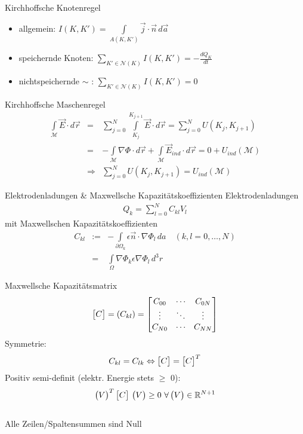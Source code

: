 \documentclass[a6paper]{kartei}
\begin{document}
\begin{karte}{Kirchhoffsche Knotenregel}
\begin{itemize}
\item allgemein: $I(K,K') = \int \limits_{A(K,K')} \vec{j} \cdot \vec{n} \, d\vec{a} $
\item speichernde Knoten: $\sum \limits_{K' \in \mathcal{N}(K)} I(K,K') = - \frac{dQ_{K}}{dt}$
\item nichtspeichernde $\sim$ : $\sum \limits_{K' \in \mathcal{N}(K)} I(K,K') = 0$
\end{itemize}
\end{karte}

\begin{karte}{Kirchhoffsche Maschenregel}
\begin{eqnarray*}
\int \limits_{\mathcal{M}} \vec{E} \cdot d\vec{r} & = &  \sum \limits_{j=0}^{N} \int \limits_{K_{j}}^{K_{j+1}} \vec{E} \cdot d\vec{r} = \sum \limits_{j=0}^{N} U(K_{j},K_{j+1}) \nonumber \\
& = & - \int \limits_{\mathcal{M}} \nabla \Phi \cdot d\vec{r} + \int \limits_{\mathcal{M}} \vec{E}_{ind} \cdot d\vec{r} = 0 + U_{ind}(\mathcal{M}) \nonumber \\
& \Rightarrow & \sum \limits_{j=0}^{N} U(K_{j},K_{j+1})  =  U_{ind}(\mathcal{M})
\end{eqnarray*}
\end{karte}

\begin{karte}{Elektrodenladungen \& Maxwellsche Kapazitätskoeffizienten}
Elektrodenladungen
 \begin{eqnarray*}
Q_{k} = \sum \limits_{l=0}^{N} C_{kl} V_{l}
\end{eqnarray*}
mit Maxwellschen Kapazitätskoeffizienten 
\begin{eqnarray*}
C_{kl} & :=  & - \int \limits_{\partial \Omega_{k}} \epsilon \vec{n} \cdot \nabla \Phi_{l} \, da \quad (k,l = 0, \dots, N) \\
& = & \int \limits_{\Omega} \nabla \Phi_{k} \epsilon \nabla \Phi_{l} \, d^3r
\end{eqnarray*}
\end{karte}

\begin{karte}{Maxwellsche Kapazitätsmatrix}
\begin{eqnarray*}
\begin{bmatrix} C \end{bmatrix} = (C_{kl}) = \begin{bmatrix} C_{00} & \cdots & C_{0N} \\ \vdots & \ddots & \vdots \\ C_{N0} & \cdots & C_{NN} \end{bmatrix}
\end{eqnarray*}
Symmetrie: 
\begin{eqnarray*}
C_{kl} = C_{lk} \Leftrightarrow \begin{bmatrix} C \end{bmatrix} = \begin{bmatrix} C \end{bmatrix}^{T}
\end{eqnarray*}
Positiv semi-definit (elektr. Energie stets $\geq$ 0): 
\begin{eqnarray*}
 \begin{pmatrix} V \end{pmatrix}^{T} \begin{bmatrix} C \end{bmatrix}  \, \begin{pmatrix} V \end{pmatrix} \geq 0 \ \forall \begin{pmatrix} V \end{pmatrix} \in \mathbb{R}^{N+1}
\end{eqnarray*}
\\Alle Zeilen/Spaltensummen sind Null
\end{karte}
\end{document}
